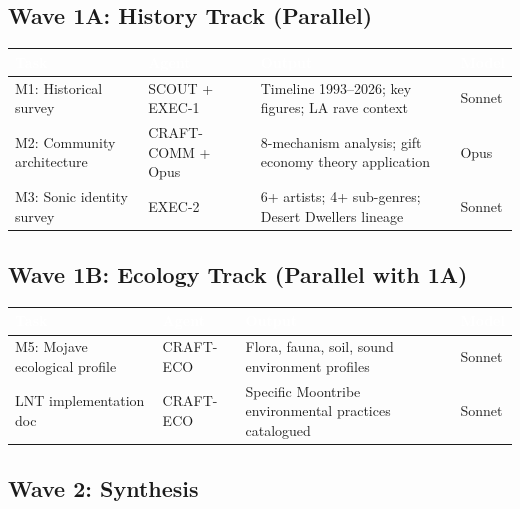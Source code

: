 \documentclass[11pt,letterpaper]{article}
\newcommand{\tableheader}[1]{\textbf{\sffamily\textcolor{white}{#1}}}
\begin{document}
\subsection{Wave 1A: History Track (Parallel)}

\begin{center}
\begin{tabularx}{\textwidth}{L{2.5cm}L{2cm}XC{2cm}}
\toprule
{}
\tableheader{Task} & \tableheader{Agent} & \tableheader{Output} & \tableheader{Model} \\
\midrule
M1: Historical survey & SCOUT + EXEC-1 & Timeline 1993--2026; key figures; LA rave context & Sonnet \\
M2: Community architecture & CRAFT-COMM + Opus & 8-mechanism analysis; gift economy theory application & Opus \\
M3: Sonic identity survey & EXEC-2 & 6+ artists; 4+ sub-genres; Desert Dwellers lineage & Sonnet \\
\bottomrule
\end{tabularx}
\end{center}

\subsection{Wave 1B: Ecology Track (Parallel with 1A)}

\begin{center}
\begin{tabularx}{\textwidth}{L{2.5cm}L{2cm}XC{2cm}}
\toprule
{}
\tableheader{Task} & \tableheader{Agent} & \tableheader{Output} & \tableheader{Model} \\
\midrule
M5: Mojave ecological profile & CRAFT-ECO & Flora, fauna, soil, sound environment profiles & Sonnet \\
LNT implementation doc & CRAFT-ECO & Specific Moontribe environmental practices catalogued & Sonnet \\
\bottomrule
\end{tabularx}
\end{center}

\subsection{Wave 2: Synthesis}
\end{document}
